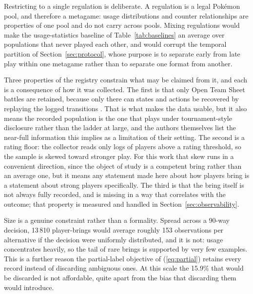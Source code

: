 \documentclass[conference]{IEEEtran}
\begin{document}
Restricting to a single regulation is deliberate. A regulation is a legal
Pok\'emon pool, and therefore a metagame: usage distributions and counter
relationships are properties of one pool and do not carry across pools. Mixing
regulations would make the usage-statistics baseline of
Table~\ref{tab:baselines} an average over populations that never played each
other, and would corrupt the temporal partition of
Section~\ref{sec:protocol}, whose purpose is to separate early from late play
within one metagame rather than to separate one format from another.

Three properties of the registry constrain what may be claimed from it, and each
is a consequence of how it was collected. The first is that only Open Team
Sheet battles are retained, because only there can states and actions be
recovered by replaying the logged transitions \cite{angliss2026}. That is what
makes the data usable, but it also means the recorded population is the one
that plays under tournament-style disclosure rather than the ladder at large,
and the authors themselves list the near-full information this implies as a
limitation of their setting. The second is a rating floor: the collector reads
only logs of players above a rating threshold, so the sample is skewed toward
stronger play. For this work that skew runs in a convenient direction, since
the object of study is a competent bring rather than an average one, but it
means any statement made here about how players bring is a statement about
strong players specifically. The third is that the bring itself is not always
fully recorded, and is missing in a way that correlates with the outcome; that
property is measured and handled in Section~\ref{sec:observability}.

Size is a genuine constraint rather than a formality. Spread across a 90-way
decision, 13\,810 player-brings would average roughly 153 observations per
alternative if the decision were uniformly distributed, and it is not: usage
concentrates heavily, so the tail of rare brings is supported by very few
examples. This is a further reason the partial-label objective of
(\ref{eq:partial}) retains every record instead of discarding ambiguous ones.
At this scale the 15.9\% that would be discarded is not affordable, quite apart
from the bias that discarding them would introduce.
\end{document}
